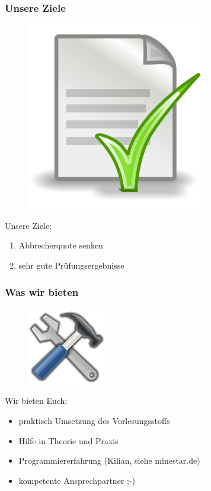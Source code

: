 \documentclass[12pt]{beamer}
\begin{document}
\begin{frame}

	\frametitle{Unsere Ziele}

	\begin{figure}
		\includegraphics[scale=0.15]{src/img/doc}
	\end{figure}

	Unsere Ziele:
	\begin{enumerate}
		\item Abbrecherquote senken
		\item sehr gute Prüfungsergebnisse
	\end{enumerate}

\end{frame}

\begin{frame}
	\frametitle{Was wir bieten}

	\begin{figure}
		\includegraphics[scale=0.55555]{src/img/tools}
	\end{figure}

	Wir bieten Euch:
	\begin{itemize}
		\item praktisch Umsetzung des Vorlesungsstoffs
		\item Hilfe in Theorie und Praxis
		\item Programmiererfahrung (Kilian, siehe minestar.de)
		\item kompetente Ansprechpartner ;-)
	\end{itemize}

\end{frame}
\end{document}
